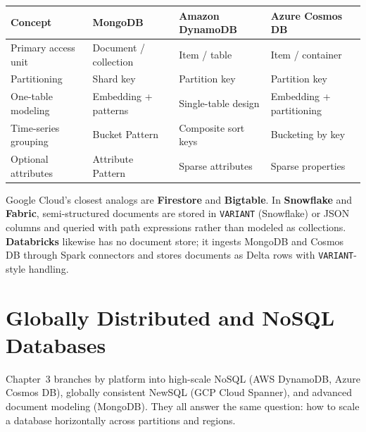 \begin{center}
\footnotesize
\begin{tabular}{@{}p{3.0cm}p{3.2cm}p{3.2cm}p{3.0cm}@{}}
\toprule
\textbf{Concept} & \textbf{MongoDB} & \textbf{Amazon DynamoDB} & \textbf{Azure Cosmos DB} \\
\midrule
Primary access unit & Document / collection & Item / table & Item / container \\
Partitioning & Shard key & Partition key & Partition key \\
One-table modeling & Embedding + patterns & Single-table design & Embedding + partitioning \\
Time-series grouping & Bucket Pattern & Composite sort keys & Bucketing by key \\
Optional attributes & Attribute Pattern & Sparse attributes & Sparse properties \\
\bottomrule
\end{tabular}
\end{center}

\noindent Google Cloud's closest analogs are \textbf{Firestore} and \textbf{Bigtable}. In
\textbf{Snowflake} and \textbf{Fabric}, semi-structured documents are stored in \texttt{VARIANT}
(Snowflake) or JSON columns and queried with path expressions rather than modeled as collections.
\textbf{Databricks} likewise has no document store; it ingests MongoDB and Cosmos DB through
Spark connectors and stores documents as Delta rows with \texttt{VARIANT}-style handling.

\section{Globally Distributed and NoSQL Databases}
%
Chapter~3 branches by platform into high-scale NoSQL (AWS DynamoDB, Azure Cosmos DB), globally
consistent NewSQL (GCP Cloud Spanner), and advanced document modeling (MongoDB). They all answer
the same question: how to scale a database horizontally across partitions and regions.

